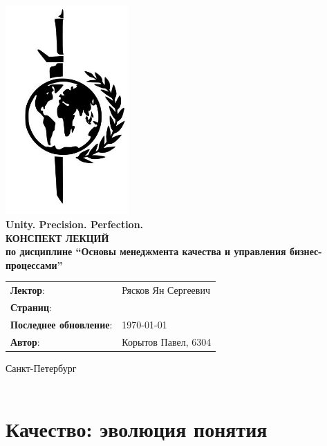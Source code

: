 \documentclass[a4paper, 14pt]{extarticle}
\begin{document}
\begin{titlepage}
    {\centering
        {\bfseries
            \includegraphics[height=8cm]{../res/logo.jpeg}\\
            Unity. Precision. Perfection.\\
            \vspace{3.5cm}
            \uppercase{Конспект лекций} \\
            по дисциплине \enquote{Основы менеджмента качества и управления бизнес-процессами}\\
        }
        \vspace{\fill}
    }
    \begin{tabular}{l l}
        \textbf{Лектор}: & Рясков Ян Сергеевич\\
        \textbf{Страниц}: &\pageref{LastPage}\\
        \textbf{Последнее обновление}: & \today{}\\ 
        \textbf{Автор}: & Корытов Павел, 6304\\
    \end{tabular}

    \vspace{2cm}
    {\centering
        Санкт-Петербург \\
        \the\year\\
    }
\end{titlepage}

\tableofcontents
\newpage

\section{Качество: эволюция понятия}
\end{document}
